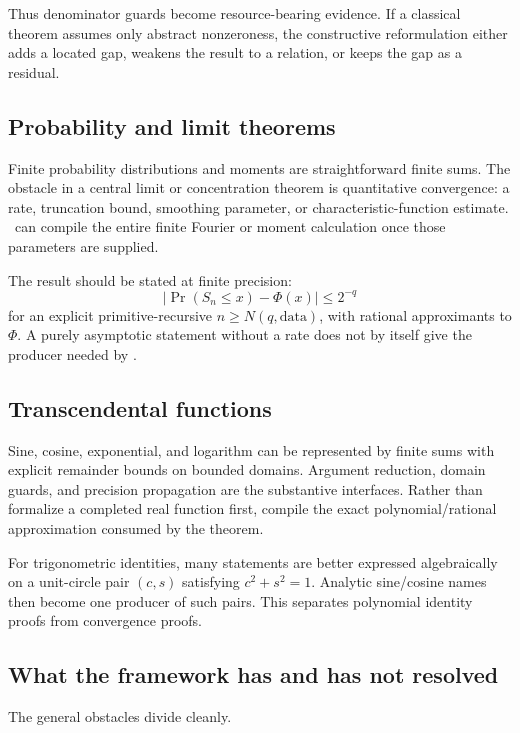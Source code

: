 Thus denominator guards become resource-bearing evidence.  If a classical theorem assumes only abstract nonzeroness, the constructive reformulation either adds a located gap, weakens the result to a relation, or keeps the gap as a residual.

\subsection{Probability and limit theorems}

Finite probability distributions and moments are straightforward finite sums.  The obstacle in a central limit or concentration theorem is quantitative convergence: a rate, truncation bound, smoothing parameter, or characteristic-function estimate.  \CIFER\ can compile the entire finite Fourier or moment calculation once those parameters are supplied.

The result should be stated at finite precision:
\[
 \left|\Pr(S_n\le x)-\Phi(x)\right|\le 2^{-q}
\]
for an explicit primitive-recursive \(n\ge N(q,\text{data})\), with rational approximants to \(\Phi\).  A purely asymptotic statement without a rate does not by itself give the producer needed by \iPRA.

\subsection{Transcendental functions}

Sine, cosine, exponential, and logarithm can be represented by finite sums with explicit remainder bounds on bounded domains.  Argument reduction, domain guards, and precision propagation are the substantive interfaces.  Rather than formalize a completed real function first, compile the exact polynomial/rational approximation consumed by the theorem.

For trigonometric identities, many statements are better expressed algebraically on a unit-circle pair \((c,s)\) satisfying \(c^2+s^2=1\).  Analytic sine/cosine names then become one producer of such pairs.  This separates polynomial identity proofs from convergence proofs.

\subsection{What the framework has and has not resolved}

The general obstacles divide cleanly.

